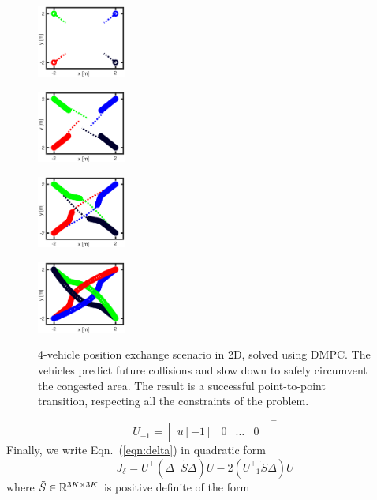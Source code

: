  \begin{figure}
 	\centering
 	
 	\begin{subfloat}{
 		\includegraphics[width=0.26\textwidth]{figures/rail_a}}
 	\end{subfloat} \hspace{-5ex}
 	\begin{subfloat}{
 			\includegraphics[width=0.26\textwidth]{figures/rail_b}}
 	\end{subfloat} \hspace{-5ex}
 	\begin{subfloat}{
 			\includegraphics[width=0.26\textwidth]{figures/rail_c}}
 	\end{subfloat} \hspace{-5ex}
 	\begin{subfloat}{
 			\includegraphics[width=0.26\textwidth]{figures/rail_d}}
 	\end{subfloat} 
 	\caption{4-vehicle position exchange scenario in 2D, solved using DMPC. The vehicles predict future collisions and slow down to safely circumvent the congested area. The result is a successful point-to-point transition, respecting all the constraints of the problem. }
 	\label{fig:four}
 \end{figure}
\begin{equation}
U_{-1} = \begin{bmatrix}
u[-1] & 0 & \ldots & 0
\end{bmatrix}^\top
\end{equation}
Finally, we write Eqn.~(\ref{eqn:delta}) in quadratic form
\begin{equation}
\label{eqn:var}
J_\delta = U^\top (\Delta^\top \tilde{S} \Delta) U - 2(U_{-1}^\top \tilde{S} \Delta )U
\end{equation}	
where $\tilde{S} \in {\mathbb R}^{3K \times 3K}$ is positive definite of the form

